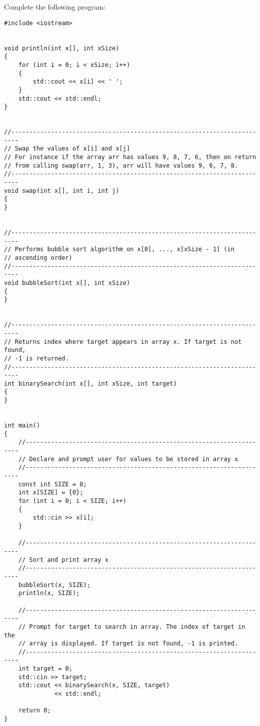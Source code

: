 Complete the following program:

\begin{Verbatim}[frame=single]
#include <iostream>


void println(int x[], int xSize)
{
    for (int i = 0; i < xSize; i++)
    {
        std::cout << x[i] << ' ';
    }
    std::cout << std::endl;
}


//------------------------------------------------------------------------
// Swap the values of x[i] and x[j]
// For instance if the array arr has values 9, 8, 7, 6, then on return
// from calling swap(arr, 1, 3), arr will have values 9, 6, 7, 8.
//------------------------------------------------------------------------
void swap(int x[], int i, int j)
{
}


//------------------------------------------------------------------------
// Performs bubble sort algorithm on x[0], ..., x[xSize - 1] (in
// ascending order)
//------------------------------------------------------------------------
void bubbleSort(int x[], int xSize)
{
}


//------------------------------------------------------------------------
// Returns index where target appears in array x. If target is not found,
// -1 is returned.
//------------------------------------------------------------------------
int binarySearch(int x[], int xSize, int target)
{
}


int main()
{
    //--------------------------------------------------------------------
    // Declare and prompt user for values to be stored in array x
    //--------------------------------------------------------------------
    const int SIZE = 8;
    int x[SIZE] = {0};
    for (int i = 0; i < SIZE; i++)
    {
        std::cin >> x[i];
    }

    //--------------------------------------------------------------------
    // Sort and print array x
    //--------------------------------------------------------------------
    bubbleSort(x, SIZE);
    println(x, SIZE);

    //--------------------------------------------------------------------
    // Prompt for target to search in array. The index of target in the
    // array is displayed. If target is not found, -1 is printed.
    //--------------------------------------------------------------------
    int target = 0;
    std::cin >> target;
    std::cout << binarySearch(x, SIZE, target)
              << std::endl;

    return 0;
}
\end{Verbatim}


